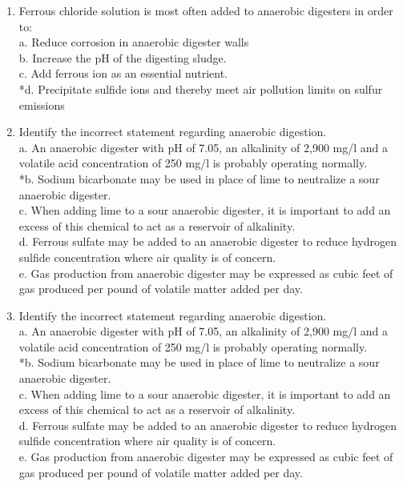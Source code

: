 \documentclass{article}
\begin{document}
\begin{enumerate}
\item  Ferrous chloride solution is most often added to anaerobic digesters in order to: \\

a. Reduce corrosion in anaerobic digester walls \\
b. Increase the pH of the digesting sludge. \\
c. Add ferrous ion as an essential nutrient. \\
*d. Precipitate sulfide ions and thereby meet air pollution limits on sulfur emissions \\

\item  Identify the incorrect statement regarding anaerobic digestion. \\

a. An anaerobic digester with pH of 7.05, an alkalinity of 2,900 mg/l and a volatile acid concentration of 250 mg/l is probably operating normally. \\
*b. Sodium bicarbonate may be used in place of lime to neutralize a sour anaerobic digester. \\
c. When adding lime to a sour anaerobic digester, it is important to add an excess of this chemical to act as a reservoir of alkalinity. \\
d. Ferrous sulfate may be added to an anaerobic digester to reduce hydrogen sulfide concentration where air quality is of concern. \\
e. Gas production from anaerobic digester may be expressed as cubic feet of gas produced per pound of volatile matter added per day. \\

\item  Identify the incorrect statement regarding anaerobic digestion. \\

a. An anaerobic digester with pH of 7.05, an alkalinity of 2,900 mg/l and a volatile acid concentration of 250 mg/l is probably operating normally. \\
*b. Sodium bicarbonate may be used in place of lime to neutralize a sour anaerobic digester. \\
c. When adding lime to a sour anaerobic digester, it is important to add an excess of this chemical to act as a reservoir of alkalinity. \\
d. Ferrous sulfate may be added to an anaerobic digester to reduce hydrogen sulfide concentration where air quality is of concern. \\
e. Gas production from anaerobic digester may be expressed as cubic feet of gas produced per pound of volatile matter added per day. \\


\end{enumerate}
\end{document}

